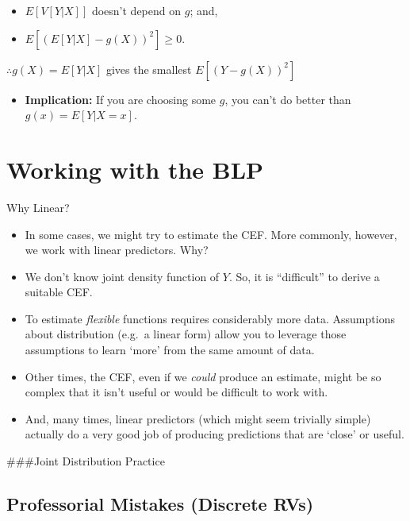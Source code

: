 \documentclass[
]{book}
\providecommand{\tightlist}{%
  \setlength{\itemsep}{0pt}\setlength{\parskip}{0pt}}
\theoremstyle{definition}
\theoremstyle{definition}
\theoremstyle{definition}
\theoremstyle{definition}
\theoremstyle{remark}
\begin{document}
\begin{itemize}
\tightlist
\item
  \(E[V[Y|X]]\) doesn't depend on \(g\); and,
\item
  \(E[(E[Y|X]-g(X))^2]\ge 0\).
\end{itemize}

\(\therefore g(X) = E[Y|X]\) gives the smallest \(E[(Y-g(X))^2]\)

\begin{itemize}
\tightlist
\item
  \textbf{Implication:} If you are choosing some \(g\), you can't do better than \(g(x) = E[Y|X=x]\).
\end{itemize}

\hypertarget{working-with-the-blp}{%
\section{Working with the BLP}\label{working-with-the-blp}}

Why Linear?

\begin{itemize}
\item
  In some cases, we might try to estimate the CEF. More commonly, however, we work with linear predictors. Why?
\item
  We don't know joint density function of \(Y\). So, it is ``difficult'' to derive a suitable CEF.
\item
  To estimate \emph{flexible} functions requires considerably more data. Assumptions about distribution (e.g.~a linear form) allow you to leverage those assumptions to learn `more' from the same amount of data.
\item
  Other times, the CEF, even if we \emph{could} produce an estimate, might be so complex that it isn't useful or would be difficult to work with.
\item
  And, many times, linear predictors (which might seem trivially simple) actually do a very good job of producing predictions that are `close' or useful.
\end{itemize}

\#\#\#Joint Distribution Practice

\hypertarget{professorial-mistakes-discrete-rvs}{%
\subsection{Professorial Mistakes (Discrete RVs)}\label{professorial-mistakes-discrete-rvs}}
\end{document}
